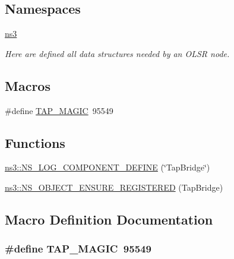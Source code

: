 \subsection*{Namespaces}
\begin{DoxyCompactItemize}
\item 
 \hyperlink{namespacens3}{ns3}
\begin{DoxyCompactList}\small\item\em Here are defined all data structures needed by an O\+L\+SR node. \end{DoxyCompactList}\end{DoxyCompactItemize}
\subsection*{Macros}
\begin{DoxyCompactItemize}
\item 
\#define \hyperlink{tap-bridge_8cc_af9ac95d538205da6013d79a63fee2bd7}{T\+A\+P\+\_\+\+M\+A\+G\+IC}~95549
\end{DoxyCompactItemize}
\subsection*{Functions}
\begin{DoxyCompactItemize}
\item 
\hyperlink{namespacens3_abbdd0e583985be11bb1a255650d4f255}{ns3\+::\+N\+S\+\_\+\+L\+O\+G\+\_\+\+C\+O\+M\+P\+O\+N\+E\+N\+T\+\_\+\+D\+E\+F\+I\+NE} (\char`\"{}Tap\+Bridge\char`\"{})
\item 
\hyperlink{namespacens3_a8a66ba257987173895f93cd3ccadf46a}{ns3\+::\+N\+S\+\_\+\+O\+B\+J\+E\+C\+T\+\_\+\+E\+N\+S\+U\+R\+E\+\_\+\+R\+E\+G\+I\+S\+T\+E\+R\+ED} (Tap\+Bridge)
\end{DoxyCompactItemize}


\subsection{Macro Definition Documentation}
\subsubsection[{\texorpdfstring{T\+A\+P\+\_\+\+M\+A\+G\+IC}{TAP_MAGIC}}]{\setlength{\rightskip}{0pt plus 5cm}\#define T\+A\+P\+\_\+\+M\+A\+G\+IC~95549}\hypertarget{tap-bridge_8cc_af9ac95d538205da6013d79a63fee2bd7}{}\label{tap-bridge_8cc_af9ac95d538205da6013d79a63fee2bd7}

